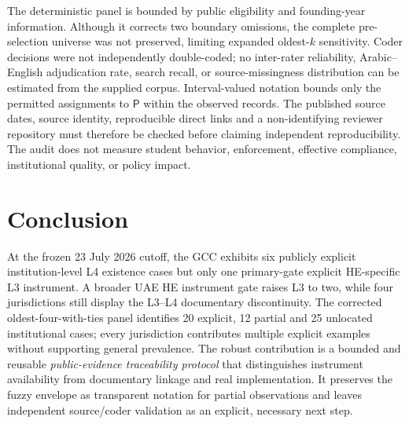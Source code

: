 \documentclass[conference,letterpaper]{IEEEtran}
\newcommand{\stP}{\textsf{P}}
\begin{document}
The deterministic panel is bounded by public eligibility and founding-year information. Although it corrects two boundary omissions, the complete pre-selection universe was not preserved, limiting expanded oldest-$k$ sensitivity. Coder decisions were not independently double-coded; no inter-rater reliability, Arabic--English adjudication rate, search recall, or source-missingness distribution can be estimated from the supplied corpus. Interval-valued notation bounds only the permitted assignments to $\stP$ within the observed records. The published source dates, source identity, reproducible direct links and a non-identifying reviewer repository must therefore be checked before claiming independent reproducibility. The audit does not measure student behavior, enforcement, effective compliance, institutional quality, or policy impact.

\section{Conclusion}
At the frozen 23 July 2026 cutoff, the GCC exhibits six publicly explicit institution-level L4 existence cases but only one primary-gate explicit HE-specific L3 instrument. A broader UAE HE instrument gate raises L3 to two, while four jurisdictions still display the L3--L4 documentary discontinuity. The corrected oldest-four-with-ties panel identifies 20 explicit, 12 partial and 25 unlocated institutional cases; every jurisdiction contributes multiple explicit examples without supporting general prevalence. The robust contribution is a bounded and reusable \emph{public-evidence traceability protocol} that distinguishes instrument availability from documentary linkage and real implementation. It preserves the fuzzy envelope as transparent notation for partial observations and leaves independent source/coder validation as an explicit, necessary next step.
\end{document}
